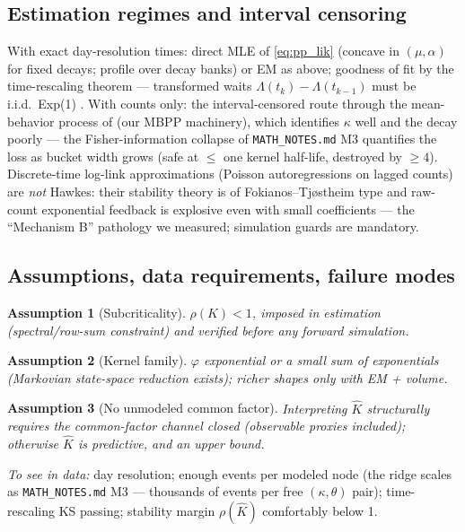 \documentclass[11pt]{article}
\newcommand{\code}[1]{\texttt{#1}}
\newtheorem{assumption}{Assumption}
\numberwithin{assumption}{section}
\numberwithin{proposition}{section}
\numberwithin{remark}{section}
\begin{document}
\subsection{Estimation regimes and interval censoring}
With exact day-resolution times: direct MLE of \eqref{eq:pp_lik} (concave
in $(\mu,\alpha)$ for fixed decays; profile over decay banks) or EM as
above; goodness of fit by the time-rescaling theorem --- transformed waits
$\Lambda(t_k)-\Lambda(t_{k-1})$ must be i.i.d.\ Exp(1)
\citep{brown2002}. With counts only: the interval-censored route through
the mean-behavior process of \citet{rizoiu2022} (our MBPP machinery), which
identifies $\kappa$ well and the decay poorly --- the Fisher-information
collapse of \code{MATH\_NOTES.md} M3 quantifies the loss as bucket width
grows (safe at $\le$ one kernel half-life, destroyed by $\ge4$).
Discrete-time log-link approximations (Poisson autoregressions on lagged
counts) are \emph{not} Hawkes: their stability theory is of
Fokianos--Tj{\o}stheim type \citep{fokianos2011} and raw-count exponential
feedback is explosive even with small coefficients --- the ``Mechanism B''
pathology we measured; simulation guards are mandatory.

\subsection{Assumptions, data requirements, failure modes}
\begin{assumption}[Subcriticality]\label{as:h_stab}
$\rho(K)<1$, imposed in estimation (spectral/row-sum constraint) and
verified before any forward simulation.
\end{assumption}
\begin{assumption}[Kernel family]\label{as:h_kernel}
$\varphi$ exponential or a small sum of exponentials (Markovian state-space
reduction exists); richer shapes only with EM + volume.
\end{assumption}
\begin{assumption}[No unmodeled common factor]\label{as:h_factor}
Interpreting $\hat K$ structurally requires the common-factor channel
closed (observable proxies included); otherwise $\hat K$ is predictive,
and an upper bound.
\end{assumption}

\emph{To see in data:} day resolution; enough events per modeled node
(the ridge scales as \code{MATH\_NOTES.md} M3 --- thousands of events per
free $(\kappa,\theta)$ pair); time-rescaling KS passing; stability margin
$\rho(\hat K)$ comfortably below 1.
\end{document}
